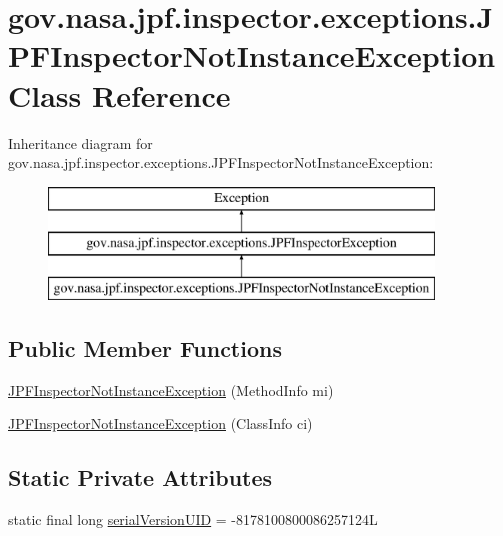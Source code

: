 \hypertarget{classgov_1_1nasa_1_1jpf_1_1inspector_1_1exceptions_1_1_j_p_f_inspector_not_instance_exception}{}\section{gov.\+nasa.\+jpf.\+inspector.\+exceptions.\+J\+P\+F\+Inspector\+Not\+Instance\+Exception Class Reference}
\label{classgov_1_1nasa_1_1jpf_1_1inspector_1_1exceptions_1_1_j_p_f_inspector_not_instance_exception}
Inheritance diagram for gov.\+nasa.\+jpf.\+inspector.\+exceptions.\+J\+P\+F\+Inspector\+Not\+Instance\+Exception\+:\begin{figure}[H]
\begin{center}
\leavevmode
\includegraphics[height=3.000000cm]{classgov_1_1nasa_1_1jpf_1_1inspector_1_1exceptions_1_1_j_p_f_inspector_not_instance_exception}
\end{center}
\end{figure}
\subsection*{Public Member Functions}
\begin{DoxyCompactItemize}
\item 
\hyperlink{classgov_1_1nasa_1_1jpf_1_1inspector_1_1exceptions_1_1_j_p_f_inspector_not_instance_exception_a385aaada03610b582da716f135e39c62}{J\+P\+F\+Inspector\+Not\+Instance\+Exception} (Method\+Info mi)
\item 
\hyperlink{classgov_1_1nasa_1_1jpf_1_1inspector_1_1exceptions_1_1_j_p_f_inspector_not_instance_exception_ab6345a8ff56764d37a54a32e57a8febd}{J\+P\+F\+Inspector\+Not\+Instance\+Exception} (Class\+Info ci)
\end{DoxyCompactItemize}
\subsection*{Static Private Attributes}
\begin{DoxyCompactItemize}
\item 
static final long \hyperlink{classgov_1_1nasa_1_1jpf_1_1inspector_1_1exceptions_1_1_j_p_f_inspector_not_instance_exception_a6d60206b645ca7772f9b069ae5057d07}{serial\+Version\+U\+ID} = -\/8178100800086257124L
\end{DoxyCompactItemize}


